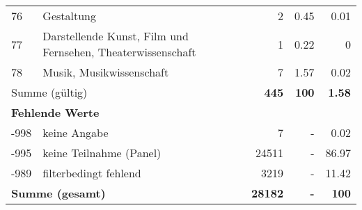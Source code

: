 \begin{longtable}{lXrrr}
        76 & \multicolumn{1}{X}{Gestaltung} & %
          \num{2} &
          \num[round-mode=places,round-precision=2]{0.45} &
          \num[round-mode=places,round-precision=2]{0.01} \\

        77 & \multicolumn{1}{X}{Darstellende Kunst, Film und Fernsehen, Theaterwissenschaft} & %
          \num{1} &
          \num[round-mode=places,round-precision=2]{0.22} &
          \num[round-mode=places,round-precision=2]{0} \\

        78 & \multicolumn{1}{X}{Musik, Musikwissenschaft} & %
          \num{7} &
          \num[round-mode=places,round-precision=2]{1.57} &
          \num[round-mode=places,round-precision=2]{0.02} \\

     \midrule
     \multicolumn{2}{l}{Summe (gültig)} &
       \textbf{\num{445}} &
     \textbf{100} &
       \textbf{\num[round-mode=places,round-precision=2]{1.58}} \\
     \multicolumn{5}{l}{\textbf{Fehlende Werte}}\\
       -998 &
       keine Angabe &
         \num{7} &
        - &
         \num[round-mode=places,round-precision=2]{0.02} \\
       -995 &
       keine Teilnahme (Panel) &
         \num{24511} &
        - &
         \num[round-mode=places,round-precision=2]{86.97} \\
       -989 &
       filterbedingt fehlend &
         \num{3219} &
        - &
         \num[round-mode=places,round-precision=2]{11.42} \\
     \midrule
     \multicolumn{2}{l}{\textbf{Summe (gesamt)}} &
          \textbf{\num{28182}} &
        \textbf{-} &
        \textbf{100} \\
     \bottomrule
     \end{longtable}
     

